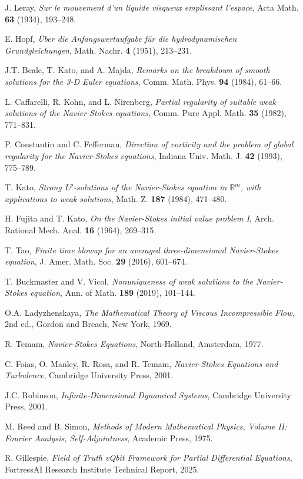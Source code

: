 \documentclass[11pt,a4paper]{article}
\theoremstyle{definition}
\theoremstyle{remark}
\newcommand{\R}{\mathbb{R}}
\begin{document}
\begin{thebibliography}{99}

J. Leray, \emph{Sur le mouvement d'un liquide visqueux emplissant l'espace}, Acta Math. \textbf{63} (1934), 193--248.

E. Hopf, \emph{Über die Anfangswertaufgabe für die hydrodynamischen Grundgleichungen}, Math. Nachr. \textbf{4} (1951), 213--231.

J.T. Beale, T. Kato, and A. Majda, \emph{Remarks on the breakdown of smooth solutions for the 3-D Euler equations}, Comm. Math. Phys. \textbf{94} (1984), 61--66.

L. Caffarelli, R. Kohn, and L. Nirenberg, \emph{Partial regularity of suitable weak solutions of the Navier-Stokes equations}, Comm. Pure Appl. Math. \textbf{35} (1982), 771--831.

P. Constantin and C. Fefferman, \emph{Direction of vorticity and the problem of global regularity for the Navier-Stokes equations}, Indiana Univ. Math. J. \textbf{42} (1993), 775--789.

T. Kato, \emph{Strong $L^p$-solutions of the Navier-Stokes equation in $\R^m$, with applications to weak solutions}, Math. Z. \textbf{187} (1984), 471--480.

H. Fujita and T. Kato, \emph{On the Navier-Stokes initial value problem I}, Arch. Rational Mech. Anal. \textbf{16} (1964), 269--315.

T. Tao, \emph{Finite time blowup for an averaged three-dimensional Navier-Stokes equation}, J. Amer. Math. Soc. \textbf{29} (2016), 601--674.

T. Buckmaster and V. Vicol, \emph{Nonuniqueness of weak solutions to the Navier-Stokes equation}, Ann. of Math. \textbf{189} (2019), 101--144.

O.A. Ladyzhenskaya, \emph{The Mathematical Theory of Viscous Incompressible Flow}, 2nd ed., Gordon and Breach, New York, 1969.

R. Temam, \emph{Navier-Stokes Equations}, North-Holland, Amsterdam, 1977.

C. Foias, O. Manley, R. Rosa, and R. Temam, \emph{Navier-Stokes Equations and Turbulence}, Cambridge University Press, 2001.

J.C. Robinson, \emph{Infinite-Dimensional Dynamical Systems}, Cambridge University Press, 2001.

M. Reed and B. Simon, \emph{Methods of Modern Mathematical Physics, Volume II: Fourier Analysis, Self-Adjointness}, Academic Press, 1975.

R. Gillespie, \emph{Field of Truth vQbit Framework for Partial Differential Equations}, FortressAI Research Institute Technical Report, 2025.

\end{thebibliography}
\end{document}
